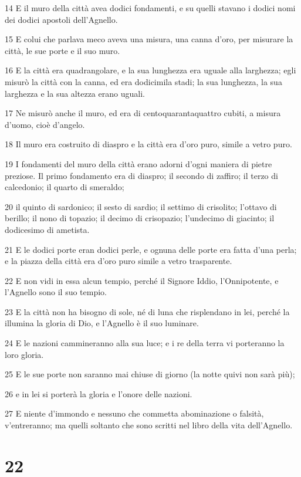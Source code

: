 \par 14 E il muro della città avea dodici fondamenti, e su quelli stavano i dodici nomi dei dodici apostoli dell'Agnello.
\par 15 E colui che parlava meco aveva una misura, una canna d'oro, per misurare la città, le sue porte e il suo muro.
\par 16 E la città era quadrangolare, e la sua lunghezza era uguale alla larghezza; egli misurò la città con la canna, ed era dodicimila stadi; la sua lunghezza, la sua larghezza e la sua altezza erano uguali.
\par 17 Ne misurò anche il muro, ed era di centoquarantaquattro cubiti, a misura d'uomo, cioè d'angelo.
\par 18 Il muro era costruito di diaspro e la città era d'oro puro, simile a vetro puro.
\par 19 I fondamenti del muro della città erano adorni d'ogni maniera di pietre preziose. Il primo fondamento era di diaspro; il secondo di zaffiro; il terzo di calcedonio; il quarto di smeraldo;
\par 20 il quinto di sardonico; il sesto di sardio; il settimo di crisolito; l'ottavo di berillo; il nono di topazio; il decimo di crisopazio; l'undecimo di giacinto; il dodicesimo di ametista.
\par 21 E le dodici porte eran dodici perle, e ognuna delle porte era fatta d'una perla; e la piazza della città era d'oro puro simile a vetro trasparente.
\par 22 E non vidi in essa alcun tempio, perché il Signore Iddio, l'Onnipotente, e l'Agnello sono il suo tempio.
\par 23 E la città non ha bisogno di sole, né di luna che risplendano in lei, perché la illumina la gloria di Dio, e l'Agnello è il suo luminare.
\par 24 E le nazioni cammineranno alla sua luce; e i re della terra vi porteranno la loro gloria.
\par 25 E le sue porte non saranno mai chiuse di giorno (la notte quivi non sarà più);
\par 26 e in lei si porterà la gloria e l'onore delle nazioni.
\par 27 E niente d'immondo e nessuno che commetta abominazione o falsità, v'entreranno; ma quelli soltanto che sono scritti nel libro della vita dell'Agnello.

\chapter{22}

